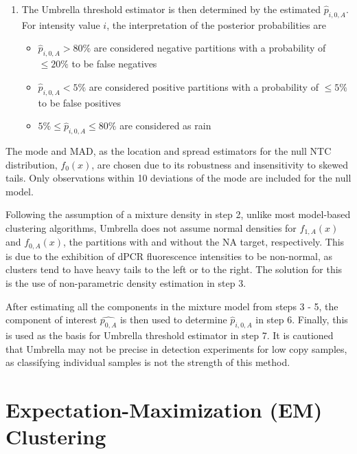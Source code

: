 \begin{enumerate}
    \item The Umbrella threshold estimator is then determined by the estimated \(\hat{p}_{i,0,A}\). For intensity value \(i\), the interpretation of the posterior probabilities are 
    \begin{itemize}
        \item \(\hat{p}_{i,0,A} > 80\%\) are considered negative partitions with a probability of \(\leq20\%\) to be false negatives
        \item \(\hat{p}_{i,0,A} < 5\%\) are considered positive partitions with a probability of \(\leq5\%\) to be false positives
        \item \(5\% \leq \hat{p}_{i,0,A} \leq 80\%\) are considered as rain
    \end{itemize}
\end{enumerate}


The mode and MAD, as the location and spread estimators for the null NTC distribution, \(f_{0}(x)\), are chosen due to its robustness and insensitivity to skewed tails. Only observations within 10 deviations of the mode are included for the null model.

Following the assumption of a mixture density in step 2, unlike most model-based clustering algorithms, Umbrella does not assume normal densities for \(f_{1,A}(x)\) and \(f_{0,A}(x)\), the partitions with and without the NA target, respectively. This is due to the exhibition of dPCR fluorescence intensities to be non-normal, as clusters tend to have heavy tails to the left or to the right. The solution for this is the use of non-parametric density estimation in step 3.

After estimating all the components in the mixture model from steps 3 - 5, the component of interest \(\hat{p_{0,A}}\) is then used to determine \(\hat{p}_{i,0,A}\) in step 6. Finally, this is used as the basis for Umbrella threshold estimator in step 7. It is cautioned that Umbrella may not be precise in detection experiments for low copy samples, as classifying individual samples is not the strength of this method.



\section{Expectation-Maximization (EM) Clustering}
\label{sec:emclustering}
